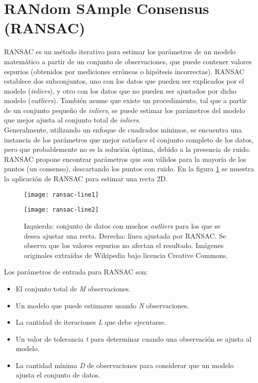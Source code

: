 \section{RANdom SAmple Consensus (RANSAC)}
\label{sec:ransac}
RANSAC \cite{Fischler81} es un método iterativo para estimar los parámetros de un modelo matemático a partir de un conjunto de observaciones, que puede contener valores espurios (obtenidos por mediciones erróneas o hipótesis incorrectas). RANSAC establece dos subconjuntos, uno con los datos que pueden ser explicados por el modelo (\textit{inliers}), y otro con los datos que no pueden ser ajustados por dicho modelo (\textit{outliers}). También asume que existe un procedimiento, tal que a partir de un conjunto pequeño de \textit{inliers}, se puede estimar los parámetros del modelo que mejor ajusta al conjunto total de \textit{inliers}. \\
Generalmente, utilizando un enfoque de cuadrados mínimos, se encuentra una instancia de los parámetros que mejor satisface el conjunto completo de los datos, pero que probablemente no es la solución óptima, debido a la presencia de ruido. RANSAC propone encontrar parámetros que son válidos para la mayoría de los puntos (un consenso), descartando los puntos con ruido. En la figura \ref{fig:ransac-line2d} se muestra la aplicación de RANSAC para estimar una recta 2D.

\begin{figure}[ht]
\centering
\begin{minipage}[h]{.45\textwidth}
\begin{center}
\texttt{[image: ransac-line1]}
\end{center}
\end{minipage}
\hfill
\begin{minipage}[h]{.45\textwidth}
\begin{center}
\texttt{[image: ransac-line2]}
\end{center}
\end{minipage}
\hfill
\caption[RANSAC para estimar una recta 2D]
{Izquierda: conjunto de datos con muchos \textit{outliers} para los que se desea ajustar una recta. Derecha: línea ajustada por RANSAC. Se observa que los valores espurios no afectan el resultado. Imágenes originales extraídas de Wikipedia bajo licencia Creative Commons.}
\label{fig:ransac-line2d}
\end{figure}

Los parámetros de entrada para RANSAC son:
\begin{itemize}

\item El conjunto total de \textsl{M} observaciones.
\item Un modelo que puede estimarse usando \textsl{N} observaciones.
\item La cantidad de iteraciones \textsl{L} que debe ejecutarse.
\item Un valor de tolerancia \textsl{t} para determinar cuando una observación se ajusta al modelo.
\item La cantidad mínima \textsl{D} de observaciones para considerar que un modelo ajusta el conjunto de datos.

\end{itemize}

